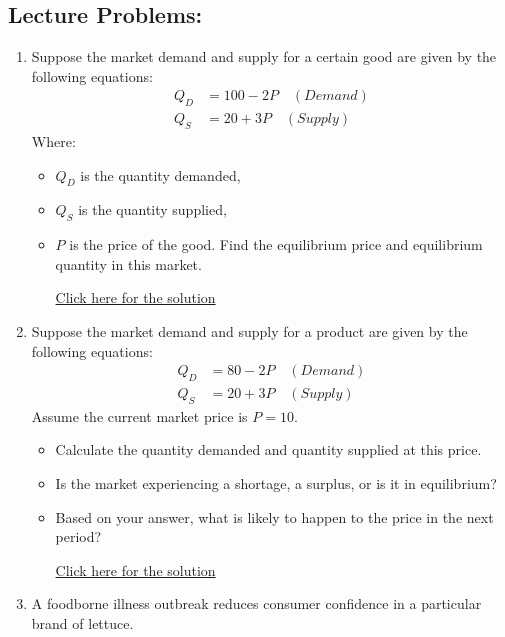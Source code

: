 \documentclass[
]{book}
\providecommand{\tightlist}{%
  \setlength{\itemsep}{0pt}\setlength{\parskip}{0pt}}
\begin{document}
\subsection*{Lecture Problems:}\label{lecture-problems-2}

\begin{enumerate}
\def\labelenumi{\arabic{enumi}.}
\tightlist
\item
  Suppose the market demand and supply for a certain good are given by the following equations:
  \begin{align*}
  Q_D &= 100 - 2P \quad (Demand) \\
  Q_S &= 20 + 3P \quad (Supply)
  \end{align*}
  Where:

  \begin{itemize}
  \tightlist
  \item
    \(Q_D\) is the quantity demanded,
  \item
    \(Q_S\) is the quantity supplied,
  \item
    \(P\) is the price of the good.
    Find the equilibrium price and equilibrium quantity in this market.

    \href{https://youtu.be/Abb7bN8yySg}{Click here for the solution}
  \end{itemize}
\item
  Suppose the market demand and supply for a product are given by the following equations:
  \begin{align*}
  Q_D &= 80 - 2P \quad (Demand) \\
  Q_S &= 20 + 3P \quad (Supply)
  \end{align*}
  Assume the current market price is \(P = 10\).

  \begin{itemize}
  \tightlist
  \item
    Calculate the quantity demanded and quantity supplied at this price.
  \item
    Is the market experiencing a shortage, a surplus, or is it in equilibrium?
  \item
    Based on your answer, what is likely to happen to the price in the next period?

    \href{\%7Bhttps://youtu.be/SKh2EvI4YLc\%7D}{Click here for the solution}
  \end{itemize}
\item
  A foodborne illness outbreak reduces consumer confidence in a particular brand of lettuce.


\end{enumerate}
\end{document}
